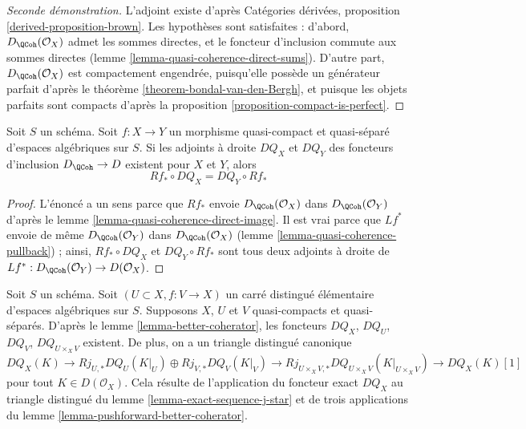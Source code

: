 \begin{proof}[Seconde démonstration]
L'adjoint existe d'après Catégories dérivées, proposition
\ref{derived-proposition-brown}. Les hypothèses sont satisfaites :
d'abord, $D_\QCoh(\mathcal{O}_X)$ admet les sommes directes,
et le foncteur d'inclusion commute aux sommes directes
(lemme \ref{lemma-quasi-coherence-direct-sums}).
D'autre part, $D_\QCoh(\mathcal{O}_X)$
est compactement engendrée, puisqu'elle possède un
générateur parfait d'après le théorème \ref{theorem-bondal-van-den-Bergh},
et puisque les objets parfaits sont compacts d'après la
proposition \ref{proposition-compact-is-perfect}.
\end{proof}

\begin{lemma}
\label{lemma-pushforward-better-coherator}
Soit $S$ un schéma.
Soit $f : X \to Y$ un morphisme quasi-compact et quasi-séparé
d'espaces algébriques sur $S$.
Si les adjoints à droite $DQ_X$ et $DQ_Y$
des foncteurs d'inclusion $D_\QCoh \to D$ existent pour $X$ et $Y$, alors
$$
Rf_* \circ DQ_X = DQ_Y \circ Rf_*
$$
\end{lemma}

\begin{proof}
L'énoncé a un sens parce que $Rf_*$ envoie
$D_\QCoh(\mathcal{O}_X)$ dans $D_\QCoh(\mathcal{O}_Y)$ d'après le
lemme \ref{lemma-quasi-coherence-direct-image}.
Il est vrai parce que $Lf^*$ envoie de même
$D_\QCoh(\mathcal{O}_Y)$ dans $D_\QCoh(\mathcal{O}_X)$
(lemme \ref{lemma-quasi-coherence-pullback}) ;
ainsi, $Rf_* \circ DQ_X$ et $DQ_Y \circ Rf_*$ sont tous deux
adjoints à droite de $Lf^* : D_\QCoh(\mathcal{O}_Y) \to D(\mathcal{O}_X)$.
\end{proof}

\begin{remark}
\label{remark-explain-consequence}
Soit $S$ un schéma. Soit $(U \subset X, f : V \to X)$ un
carré distingué élémentaire d'espaces algébriques sur $S$.
Supposons $X$, $U$ et $V$ quasi-compacts et quasi-séparés.
D'après le lemme \ref{lemma-better-coherator}, les foncteurs
$DQ_X$, $DQ_U$, $DQ_V$, $DQ_{U \times_X V}$ existent. De plus, on a un
triangle distingué canonique
$$
DQ_X(K) \to Rj_{U, *}DQ_U(K|_U) \oplus Rj_{V, *}DQ_V(K|_V)
\to Rj_{U \times_X V, *}DQ_{U \times_X V}(K|_{U \times_X V})
\to DQ_X(K)[1]
$$
pour tout $K \in D(\mathcal{O}_X)$. Cela résulte de l'application du
foncteur exact $DQ_X$ au triangle distingué du
lemme \ref{lemma-exact-sequence-j-star}
et de trois applications du lemme \ref{lemma-pushforward-better-coherator}.
\end{remark}

